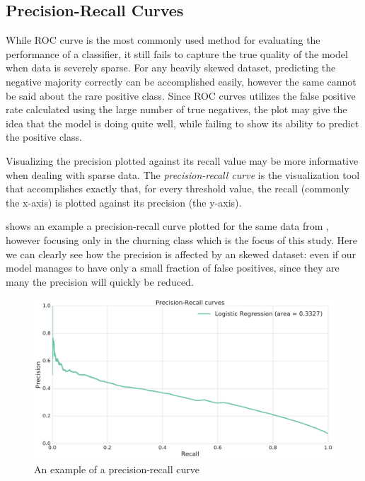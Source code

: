 \documentclass{kththesis}
\begin{document}
\subsection{Precision-Recall Curves}

While ROC curve is the most commonly used method for evaluating the performance of a classifier, it still fails to capture the true quality of the model when data is severely sparse. For any heavily skewed dataset, predicting the negative majority correctly can be accomplished easily, however the same cannot be said about the rare positive class. Since ROC curves utilizes the false positive rate calculated using the large number of true negatives, the plot may give the idea that the model is doing quite well, while failing to show its ability to predict the positive class. 

Visualizing the precision plotted against its recall value may be more informative when dealing with sparse data. The \emph{precision-recall curve} is the visualization tool that accomplishes exactly that, for every threshold value, the recall (commonly the x-axis) is plotted against its precision (the y-axis). 

 shows an example a precision-recall curve plotted for the same data from , however focusing only in the churning class which is the focus of this study. Here we can clearly see how the precision is affected by an skewed dataset: even if our model manages to have only a small fraction of false positives, since they are many the precision will quickly be reduced.

\begin{figure}[h]
    \centering
    \includegraphics[width=1.0\textwidth,keepaspectratio]{figures/prc_example.pdf}
    \caption{An example of a precision-recall curve}
    \label{fig:prc_example}
\end{figure}
\end{document}

